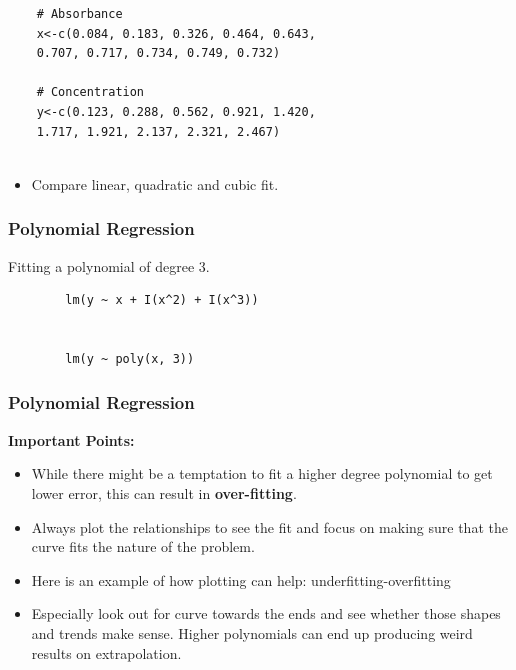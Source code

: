 \documentclass{beamer}
\begin{document}
\begin{frame}[fragile]
	\large
	\begin{framed}
	\begin{verbatim}
	# Absorbance 
	x<-c(0.084, 0.183, 0.326, 0.464, 0.643, 
	0.707, 0.717, 0.734, 0.749, 0.732)
	
	# Concentration 
	y<-c(0.123, 0.288, 0.562, 0.921, 1.420, 
	1.717, 1.921, 2.137, 2.321, 2.467)
	
	\end{verbatim}
	\end{framed}
	\begin{itemize}
		\item Compare linear, quadratic and cubic fit.
	\end{itemize}
\end{frame}
\begin{frame}[fragile]
\frametitle{Polynomial Regression}
		\Large
		Fitting a polynomial of degree 3.
	\begin{framed}
		\begin{verbatim}
		lm(y ~ x + I(x^2) + I(x^3))
	
		
		lm(y ~ poly(x, 3))
		\end{verbatim}
	\end{framed}
\end{frame}
\begin{frame}
	\frametitle{Polynomial Regression}
\textbf{Important Points:}
	
	\begin{itemize}
\item 	While there might be a temptation to fit a higher degree polynomial to get lower error, this can result in \textbf{over-fitting}. \item Always plot the relationships to see the fit and focus on making sure that the curve fits the nature of the problem. 
\item Here is an example of how plotting can help:
	underfitting-overfitting
	
\item 	Especially look out for curve towards the ends and see whether those shapes and trends make sense. Higher polynomials can end up producing weird results on extrapolation.
	\end{itemize}

	
\end{frame} 
\end{document}
